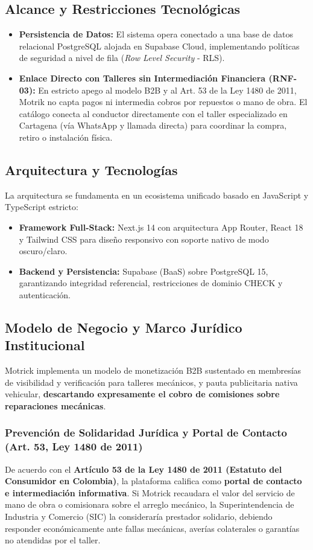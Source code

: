 \documentclass[11pt,letterpaper]{article}
\begin{document}
\subsection{Alcance y Restricciones Tecnológicas}
\begin{itemize}
    \item \textbf{Persistencia de Datos:} El sistema opera conectado a una base de datos relacional PostgreSQL alojada en Supabase Cloud, implementando políticas de seguridad a nivel de fila (\textit{Row Level Security} - RLS).
    \item \textbf{Enlace Directo con Talleres sin Intermediación Financiera (RNF-03):} En estricto apego al modelo B2B y al Art. 53 de la Ley 1480 de 2011, Motrik no capta pagos ni intermedia cobros por repuestos o mano de obra. El catálogo conecta al conductor directamente con el taller especializado en Cartagena (vía WhatsApp y llamada directa) para coordinar la compra, retiro o instalación física.
\end{itemize}

\subsection{Arquitectura y Tecnologías}
La arquitectura se fundamenta en un ecosistema unificado basado en JavaScript y TypeScript estricto:
\begin{itemize}
    \item \textbf{Framework Full-Stack:} Next.js 14 con arquitectura App Router, React 18 y Tailwind CSS para diseño responsivo con soporte nativo de modo oscuro/claro.
    \item \textbf{Backend y Persistencia:} Supabase (BaaS) sobre PostgreSQL 15, garantizando integridad referencial, restricciones de dominio CHECK y autenticación.
\end{itemize}

\subsection{Modelo de Negocio y Marco Jurídico Institucional}
Motrick implementa un modelo de monetización B2B sustentado en membresías de visibilidad y verificación para talleres mecánicos, y pauta publicitaria nativa vehicular, \textbf{descartando expresamente el cobro de comisiones sobre reparaciones mecánicas}.

\subsubsection{Prevención de Solidaridad Jurídica y Portal de Contacto (Art. 53, Ley 1480 de 2011)}
De acuerdo con el \textbf{Artículo 53 de la Ley 1480 de 2011 (Estatuto del Consumidor en Colombia)}, la plataforma califica como \textbf{portal de contacto e intermediación informativa}. Si Motrick recaudara el valor del servicio de mano de obra o comisionara sobre el arreglo mecánico, la Superintendencia de Industria y Comercio (SIC) la consideraría prestador solidario, debiendo responder económicamente ante fallas mecánicas, averías colaterales o garantías no atendidas por el taller.
\end{document}
